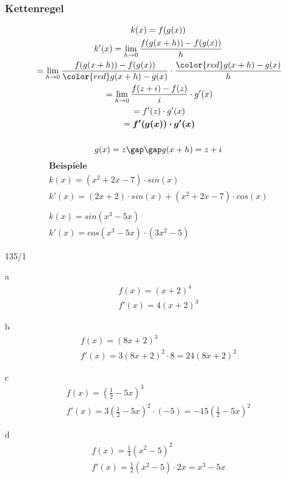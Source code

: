 \subsubsection{Kettenregel}
\begin{gather*}
  k(x) = f(g(x)) \\
  k'(x) = \lim\limits_{h \to 0} \frac{f(g(x + h)) - f(g(x))}{h} \\
  \;= \lim\limits_{h \to 0} \frac{f(g(x + h)) - f(g(x))}{{\color{red}g(x + h) - g(x)}} \cdot \frac{{\color{red}g(x + h) - g(x)}}{h} \\
  \;= \lim\limits_{h \to 0} \frac{f(z + i) - f(z)}{i} \cdot g'(x) \\
  \;= f'(z) \cdot g'(x) \\
  \;= \boldsymbol{f'(g(x)) \cdot g'(x)} \\\\
  g(x) = z \gap\gap g(x + h) = z + i
\end{gather*}
\begin{gather*}
  \textbf{Beispiele} \\
  k(x) = (x^2 + 2x - 7) \cdot sin(x) \\
  k'(x) = (2x + 2) \cdot sin(x) + (x^2 + 2x - 7) \cdot cos(x) \\\\
  k(x) = sin(x^3 - 5x) \\
  k'(x) = cos(x^3 - 5x) \cdot (3x^2 - 5)
\end{gather*}
\begin{exercise}{135/1}
  \item [a]
  \begin{gather*}
    f(x) = (x + 2)^4 \\
    f'(x) = 4(x + 2)^3
  \end{gather*}
  \item [b]
  \begin{gather*}
    f(x) = (8x + 2)^3 \\
    f'(x) = 3(8x + 2)^2 \cdot 8 = 24(8x + 2)^2
  \end{gather*}
  \item [c]
  \begin{gather*}
    f(x) = (\frac{1}{2} - 5x)^3 \\
    f'(x) = 3(\frac{1}{2} - 5x)^2 \cdot (-5) = -15(\frac{1}{2} - 5x)^2
  \end{gather*}
  \item [d]
  \begin{gather*}
    f(x) = \frac{1}{4}(x^2 - 5)^2 \\
    f'(x) = \frac{1}{2}(x^2 - 5) \cdot 2x = x^3 - 5x
  \end{gather*}
\end{exercise}
